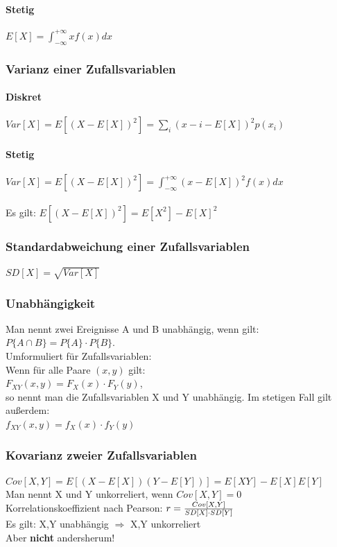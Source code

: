 \paragraph{Stetig}
$ E[X] = \int_{-\infty}^{+\infty} x f(x)dx $

\subsubsection{Varianz einer Zufallsvariablen}
\paragraph{Diskret}
$ Var[X] = E[(X-E[X])^2] = \sum_i (x-i - E[X])^2 p(x_i) $
\paragraph{Stetig}
$ Var[X] = E[(X-E[X])^2] = \int_{-\infty}^{+\infty} (x-E[X])^2 f(x)dx $ \\\\
Es gilt: $ E[(X-E[X])^2] = E[X^2] - E[X]^2 $

\subsubsection{Standardabweichung einer Zufallsvariablen}
$ SD[X] = \sqrt{Var[X]} $

\subsubsection{Unabhängigkeit}
Man nennt zwei Ereignisse A und B unabhängig, wenn gilt: \\
$ P\{ A \cap B \} = P\{ A \} \cdot P\{ B \} $. \\
Umformuliert für Zufallsvariablen: \\
Wenn für alle Paare $(x,y)$ gilt: \\
$ F_{XY}(x,y) = F_X(x) \cdot F_Y(y) $, \\
so nennt man die Zufallsvariablen X und Y unabhängig. Im stetigen Fall gilt außerdem: \\
$ f_{XY}(x,y) = f_X(x) \cdot f_Y(y) $

\subsubsection{Kovarianz zweier Zufallsvariablen}
$ Cov[X,Y] = E[(X-E[X])(Y-E[Y])] = E[XY] - E[X]E[Y] $ \\
Man nennt X und Y unkorreliert, wenn $ Cov[X,Y] = 0 $ \\
Korrelationskoeffizient nach Pearson: $ r = {Cov[X,Y] \over SD[X] \cdot SD[Y]} $ \\
Es gilt: X,Y unabhängig $\Rightarrow$ X,Y unkorreliert \\
Aber \textbf{nicht} andersherum!

